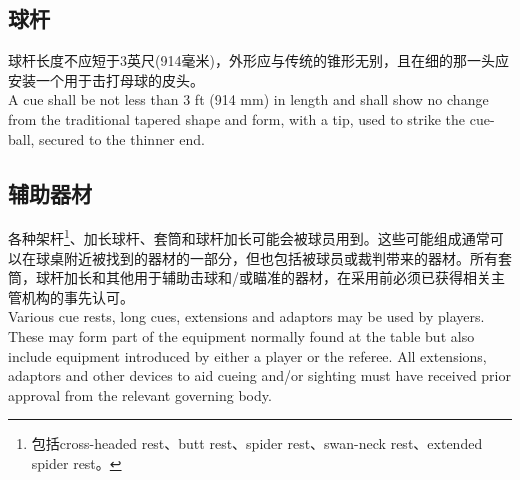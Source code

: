 \subsection{球杆}

\noindent 球杆长度不应短于3英尺(914毫米)，外形应与传统的锥形无别，且在细的那一头应安装一个用于击打母球的皮头。\\
A cue shall be not less than 3 ft (914 mm) in length and shall show no change from the traditional tapered shape and form, with a tip, used to strike the cue-ball, secured to the thinner end.

\subsection{辅助器材}

\noindent 各种架杆\footnote{包括cross-headed rest、butt rest、spider rest、swan-neck rest、extended spider rest。}、加长球杆、套筒和球杆加长可能会被球员用到。这些可能组成通常可以在球桌附近被找到的器材的一部分，但也包括被球员或裁判带来的器材。所有套筒，球杆加长和其他用于辅助击球和/或瞄准的器材，在采用前必须已获得相关主管机构的事先认可。\\
Various cue rests, long cues, extensions and adaptors may be used by players. These may form part of the equipment normally found at the table but also include equipment introduced by either a player or the referee. All extensions, adaptors and other devices to aid cueing and/or sighting must have received prior approval from the relevant governing body.
